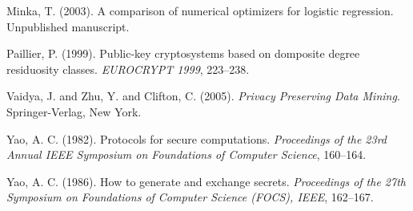 \documentclass[11pt]{article}
\begin{document}
\begin{thebibliography}{99}
Minka, T. (2003). A comparison of numerical optimizers for logistic regression.  Unpublished manuscript.


Paillier, P. (1999). Public-key cryptosystems based on domposite degree residuosity classes.  \textit{EUROCRYPT 1999}, 223--238.

Vaidya, J. and Zhu, Y. and Clifton, C. (2005).  \textit{Privacy Preserving Data Mining}.  Springer-Verlag, New York.


Yao, A. C. (1982). Protocols for secure computations. \textit{Proceedings of the 23rd Annual IEEE Symposium on Foundations of Computer Science}, 160--164.



Yao, A. C. (1986). How to generate and exchange secrets. \textit{Proceedings of the 27th Symposium on Foundations of Computer Science (FOCS), IEEE}, 162--167.



\end{thebibliography}
\end{document}
